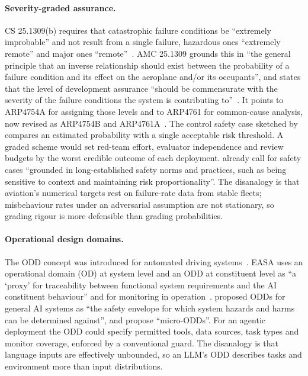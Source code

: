 \documentclass{aer}
\begin{document}
\paragraph{Severity-graded assurance.} CS 25.1309(b) requires that catastrophic failure conditions be ``extremely improbable'' and not result from a single failure, hazardous ones ``extremely remote'' and major ones ``remote''~\citep{easa2020cs25}. AMC 25.1309 grounds this in ``the general principle that an inverse relationship should exist between the probability of a failure condition and its effect on the aeroplane and/or its occupants'', and states that the level of development assurance ``should be commensurate with the severity of the failure conditions the system is contributing to''~\citep[paras.~6.a and~9.b(4)]{easa2021amc25}. It points to ARP4754A for assigning those levels and to ARP4761 for common-cause analysis, now revised as ARP4754B and ARP4761A~\citep{sae2023arp4754b,sae2023arp4761a}. The control safety case sketched by \citet{korbak2025sketch} compares an estimated probability with a single acceptable risk threshold. A graded scheme would set red-team effort, evaluator independence and review budgets by the worst credible outcome of each deployment. \citet{habli2025big} already call for safety cases ``grounded in long-established safety norms and practices, such as being sensitive to context and maintaining risk proportionality''. The disanalogy is that aviation's numerical targets rest on failure-rate data from stable fleets; misbehaviour rates under an adversarial assumption are not stationary, so grading rigour is more defensible than grading probabilities.

\paragraph{Operational design domains.} The ODD concept was introduced for automated driving systems~\citep{khlaaf2023toward}. EASA uses an operational domain (OD) at system level and an ODD at constituent level as ``a `proxy' for traceability between functional system requirements and the AI constituent behaviour'' and for monitoring in operation~\citeyearpar[Section~B.5.2]{easa2026concept}. \citet{khlaaf2023toward} proposed ODDs for general AI systems as ``the safety envelope for which system hazards and harms can be determined against'', and \citet{bloomfield2024assurance} propose ``micro-ODDs''. For an agentic deployment the ODD could specify permitted tools, data sources, task types and monitor coverage, enforced by a conventional guard. The disanalogy is that language inputs are effectively unbounded, so an LLM's ODD describes tasks and environment more than input distributions.
\end{document}
